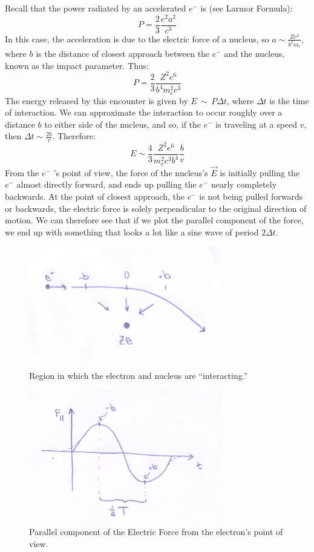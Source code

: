 \documentclass{article}
\def\ef{\vec E}
\def\ef{\vec E}
\begin{document}
Recall that the power radiated by an accelerated
$e^-$ is (see Larmor Formula):
$$P=\frac{2}{3}\frac{e^2a^2}{ c^3}$$
In this case, the acceleration is due to the electric force of a
nucleus, so $a\sim\frac{Ze^2}{ b^2m_e}$, where $b$ is the distance of
closest approach between the $e^-$ and the nucleus, known as the impact parameter.  Thus:
$$P=\frac{2}{3}\frac{Z^2e^6}{ b^4m_e^2c^3}$$
The energy released by this encounter is given by $E \,\sim\, P\Delta t$, where
$\Delta t$ is the time of interaction.  We can approximate the interaction to occur roughly over a distance $b$ to either side of the nucleus, and so, if the $e^-$ is traveling at a speed $v$, then
$\Delta t\sim\frac{2b}{ v}$.  Therefore:
$$E\sim\frac{4}{3}\frac{Z^2e^6}{ m_e^2c^3b^4}\frac{b}{ v}$$
From the $e^-$ 's point of view, the force of the nucleus's $\ef$ is initially pulling the $e^-$ almost directly forward, and ends up pulling
the $e^-$ nearly completely backwards.  At the point of closest approach, the $e^-$ is not being pulled forwards or backwards, the electric force is solely perpendicular to the original direction of motion. We can therefore see that if we plot the parallel component of the force, we end up with something that looks a lot like a sine wave of period $2\Delta t$.  
\begin{figure}
    \centering
    \includegraphics[width=0.75\textwidth]{figures/800px-InteractionRange.jpg}
    \caption{Region in which the electron and nucleus are ``interacting.''}
    \label{fig:intRange}
\end{figure}
\begin{figure}
    \centering
    \includegraphics[width=0.75\textwidth]{figures/800px-ParallelForce.jpg}
    \caption{Parallel component of the Electric Force from the electron’s point of view.}
    \label{fig:parforce}
\end{figure}
\end{document}
